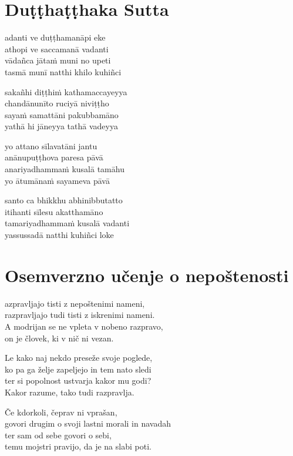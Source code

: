 

\cleartoverso
\chapter*{Duṭṭhaṭṭhaka Sutta}

adanti ve duṭṭhamanāpi eke\\
athopi ve saccamanā vadanti\\
vādañca jātaṁ muni no upeti\\
tasmā munī natthi khilo kuhiñci

sakañhi diṭṭhiṁ kathamaccayeyya\\
chandānunīto ruciyā niviṭṭho\\
sayaṁ samattāni pakubbamāno\\
yathā hi jāneyya tathā vadeyya

yo attano sīlavatāni jantu\\
anānupuṭṭhova paresa pāvā\\
anariyadhammaṁ kusalā tamāhu\\
yo ātumānaṁ sayameva pāvā

santo ca bhikkhu abhinibbutatto\\
itihanti sīlesu akatthamāno\\
tamariyadhammaṁ kusalā vadanti\\
yassussadā natthi kuhiñci loke


\cleartorecto
\chapter{Osemverzno učenje o nepoštenosti}

azpravljajo tisti z nepoštenimi nameni,\\
razpravljajo tudi tisti z iskrenimi nameni.\\
A modrijan se ne vpleta v nobeno razpravo,\\
on je človek, ki v nič ni vezan.

Le kako naj nekdo preseže svoje poglede,\\
ko pa ga želje zapeljejo in tem nato sledi\\
ter si popolnost ustvarja kakor mu godi?\\
Kakor razume, tako tudi razpravlja.

Če kdorkoli, čeprav ni vprašan,\\
govori drugim o svoji lastni morali in navadah\\
ter sam od sebe govori o sebi,\\
temu mojstri pravijo, da je na slabi poti.

